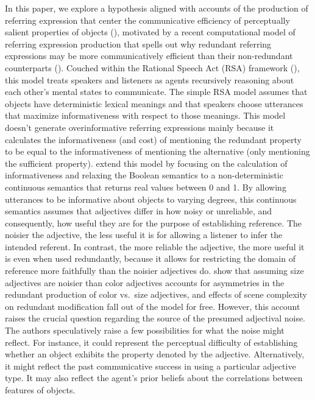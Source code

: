 \documentclass[12pt,letterpaper]{article}
\begin{document}
In this paper, we explore a hypothesis aligned with accounts of the production of referring expression that center the communicative efficiency of perceptually salient properties of objects (\citealt{EttingerFernandez2020}), motivated by a recent computational model of referring expression production that spells out why redundant referring expressions may be more communicatively efficient than their non-redundant counterparts (\citealt{DegenEtAl2020}). Couched within the Rational Speech Act (RSA) framework (\citealt{Goodman2016}), this model treats speakers and listeners as agents recursively reasoning about each other's mental states to communicate. The simple RSA model assumes that objects have deterministic lexical meanings and that speakers choose utterances that maximize informativeness with respect to those meanings. This model doesn't generate overinformative referring expressions mainly because it calculates the informativeness (and cost) of mentioning the redundant property to be equal to the informativeness of mentioning the alternative (only mentioning the sufficient property). \citet{DegenEtAl2020} extend this model by focusing on the calculation of informativeness and relaxing the Boolean semantics to a non-deterministic continuous semantics that returns real values between 0 and 1. By allowing utterances to be informative about objects to varying degrees, this continuous semantics assumes that adjectives differ in how noisy or unreliable, and consequently, how useful they are for the purpose of establishing reference. The noisier the adjective, the less useful it is for allowing a listener to infer the intended referent. In contrast, the more reliable the adjective, the more useful it is even when used redundantly, because it allows for restricting the domain of reference more faithfully than the noisier adjectives do. \citet{DegenEtAl2020} show that assuming size adjectives are noisier than color adjectives accounts for asymmetries in the redundant production of color vs.~size adjectives, and effects of scene complexity on redundant modification fall out of the model for free. However, this account raises the crucial question regarding the source of the presumed adjectival noise. The authors speculatively raise a few possibilities for what the noise might reflect. For instance, it could represent the perceptual difficulty of establishing whether an object exhibits the property denoted by the adjective. Alternatively, it might reflect the past communicative success in using a particular adjective type. It may also reflect the agent's prior beliefs about the correlations between features of objects. 
\end{document}
